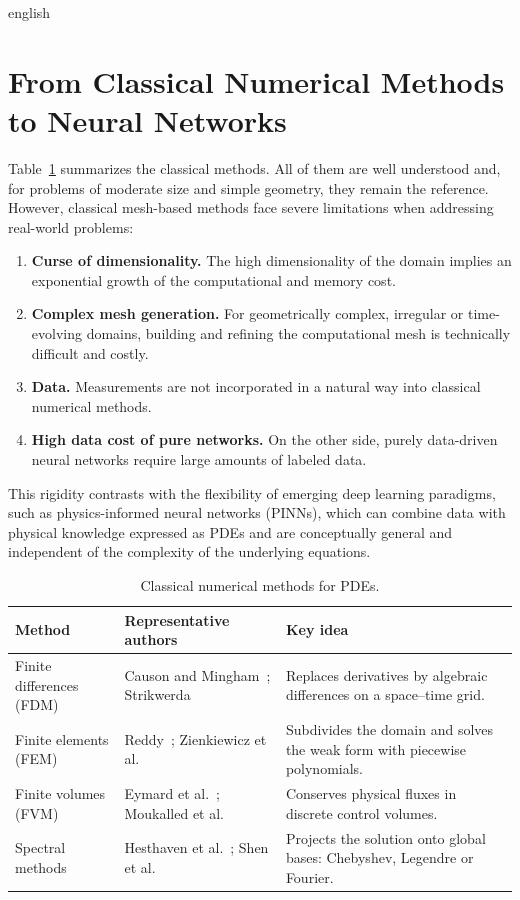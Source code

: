 \documentclass[12pt,letterpaper,twoside]{book}
\begin{document}
\begin{hyphenrules}{english}
\section{From Classical Numerical Methods to Neural Networks}\label{sec:pinn-background}

Table~\ref{tab:classical-methods} summarizes the classical methods. All of them are well understood and,
for problems of moderate size and simple geometry, they remain the reference. However, classical
mesh-based methods face severe limitations when addressing real-world problems:
\begin{enumerate}
  \item \textbf{Curse of dimensionality.} The high dimensionality of the domain implies an exponential
    growth of the computational and memory cost.
  \item \textbf{Complex mesh generation.} For geometrically complex, irregular or time-evolving domains,
    building and refining the computational mesh is technically difficult and costly.
  \item \textbf{Data.} Measurements are not incorporated in a natural way into classical numerical
    methods.
  \item \textbf{High data cost of pure networks.} On the other side, purely data-driven neural
    networks require large amounts of labeled data.
\end{enumerate}
This rigidity contrasts with the flexibility of emerging deep learning paradigms, such as
physics-informed neural networks (PINNs), which can combine data with physical knowledge expressed as
PDEs and are conceptually general and independent of the complexity of the underlying equations.

\begin{table}[htbp]
  \centering
  \caption{Classical numerical methods for PDEs.}
  \label{tab:classical-methods}
  \small
  \begin{tabularx}{\linewidth}{@{}lXX@{}}
    \toprule
    Method & Representative authors & Key idea \\
    \midrule
    Finite differences (FDM) & Causon and Mingham~\cite{causon2010}; Strikwerda~\cite{strikwerda2004} &
      Replaces derivatives by algebraic differences on a space--time grid. \\
    Finite elements (FEM) & Reddy~\cite{reddy2019}; Zienkiewicz et al.~\cite{zienkiewicz2013} &
      Subdivides the domain and solves the weak form with piecewise polynomials. \\
    Finite volumes (FVM) & Eymard et al.~\cite{eymard2000}; Moukalled et al.~\cite{moukalled2016} &
      Conserves physical fluxes in discrete control volumes. \\
    Spectral methods & Hesthaven et al.~\cite{hesthaven2007}; Shen et al.~\cite{shen2011} &
      Projects the solution onto global bases: Chebyshev, Legendre or Fourier. \\
    \bottomrule
  \end{tabularx}
\end{table}


\end{hyphenrules}
\end{document}
